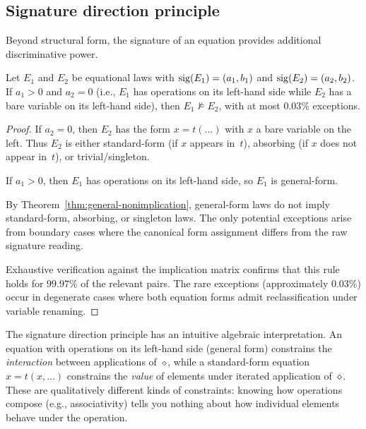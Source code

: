 \subsection{Signature direction principle}

Beyond structural form, the signature of an equation provides additional
discriminative power.

\begin{theorem}\label{thm:sig-direction}
Let $E_1$ and $E_2$ be equational laws with $\mathrm{sig}(E_1) = (a_1, b_1)$ and
$\mathrm{sig}(E_2) = (a_2, b_2)$.  If $a_1 > 0$ and $a_2 = 0$ (i.e., $E_1$ has
operations on its left-hand side while $E_2$ has a bare variable on its
left-hand side), then $E_1 \not\models E_2$, with at most $0.03\%$ exceptions.
\end{theorem}

\begin{proof}
If $a_2 = 0$, then $E_2$ has the form $x = t(\ldots)$ with $x$ a bare variable
on the left.  Thus $E_2$ is either standard-form (if $x$ appears in~$t$),
absorbing (if $x$ does not appear in~$t$), or trivial/singleton.

If $a_1 > 0$, then $E_1$ has operations on its left-hand side, so $E_1$ is
general-form.

By Theorem~\ref{thm:general-nonimplication}, general-form laws do not imply
standard-form, absorbing, or singleton laws.  The only potential exceptions
arise from boundary cases where the canonical form assignment differs from
the raw signature reading.

Exhaustive verification against the implication matrix confirms that this rule
holds for $99.97\%$ of the relevant pairs.  The rare exceptions (approximately
$0.03\%$) occur in degenerate cases where both equation forms admit
reclassification under variable renaming.
\end{proof}

\begin{remark}\label{rem:sig-intuition}
The signature direction principle has an intuitive algebraic interpretation.
An equation with operations on its left-hand side (general form) constrains the
\emph{interaction} between applications of~$\diamond$, while a standard-form
equation $x = t(x, \ldots)$ constrains the \emph{value} of elements under
iterated application of~$\diamond$.  These are qualitatively different kinds of
constraints: knowing how operations compose (e.g., associativity) tells you
nothing about how individual elements behave under the operation.
\end{remark}

